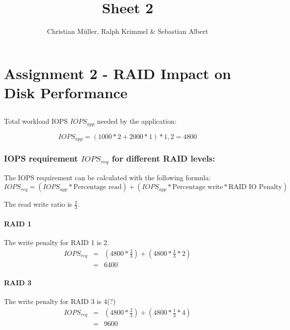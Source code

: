\documentclass{article}
\title{Sheet 2}
\author{Christian Müller, Ralph Krimmel \& Sebastian Albert }
\begin{document}
\maketitle

\section*{Assignment 2 - RAID Impact on Disk Performance} 
\subsection{}

Total workload IOPS $IOPS_{app}$ needed by the application:

\begin{equation}
	IOPS_{app} = (1000 * 2 + 2000 * 1) * 1,2 = 4800
\end{equation}

\subsubsection*{IOPS requirement \textbf{$IOPS_{req}$} for different RAID levels:}
The IOPS requirement can be calculated with the following formula:
\begin{equation}
	IOPS_{req} = (IOPS_{app} * \text{Percentage read}) + (IOPS_{app} * \text{Percentage write} * \text{RAID IO Penalty})
\end{equation}


The read write ratio is $\frac{2}{3}$.

\paragraph{RAID 1}
The write penalty for RAID 1 is 2.
\begin{eqnarray*}
	IOPS_{req} &=&  (4800 * \frac{2}{3}) + (4800 * \frac{1}{3} * 2)  \\
		   &=&  6400
\end{eqnarray*}


\paragraph{RAID 3}
The write penalty for RAID 3 is 4(?)
\begin{eqnarray*}
	IOPS_{req} &=&  (4800 * \frac{2}{3}) + (4800 * \frac{1}{3} * 4)  \\
		   &=&  9600
\end{eqnarray*}
\end{document}

